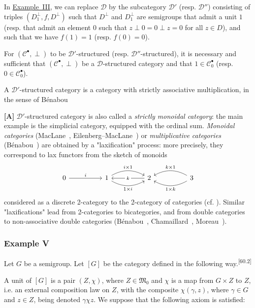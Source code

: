 \documentclass[a4paper,fleqn]{article}
\makeatletter
\theoremstyle{plain}
\theoremstyle{definition}
\def\blfootnote{\xdef\@thefnmark{}\@footnotetext}
\newcommand{\comm}[2]{{\normalfont\textsuperscript{[#1]}}\blfootnote{\label{footnote:#1}\textbf{[#1]} #2}}
\newenvironment{longcomm}[1]
  {\noindent\textbf{[#1]}\rmfamily}
  {}
\newcommand{\oldpage}[1]{{\marginpar{\footnotesize$\bigg\vert$\,\,\,\,\textit{p.~#1}}}}
\newcommand{\CC}{\mathcal{C}}
\newcommand{\MM}{\mathfrak{M}}
\newcommand{\DD}{\mathcal{D}}
\makeatother
\begin{document}
\oldpage{388}
In \hyperref[section:ii-3-iii]{Example~III}, we can replace $\DD$ by the subcategory $\DD'$ (resp. $\DD''$) consisting of triples $(D_1^\perp,f,D^\perp)$ such that $D^\perp$ and $D_1^\perp$ are semigroups that admit a unit $1$ (resp. that admit an element $0$ such that $z\perp0=0\perp z=0$ for all $z\in D$), and such that we have $f(1)=1$ (resp. $f(0)=0$).

For $(\CC^\bullet,\perp)$ to be $\DD'$-structured (resp. $\DD''$-structured), it is necessary and sufficient that $(\CC^\bullet,\perp)$ be a $\DD$-structured category and that $1\in\CC_0^\bullet$ (resp. $0\in\CC_0^\bullet$).

A $\DD'$-structured category is a category with strictly associative multiplication, in the sense of Bénabou~\cite{comm1}

\begin{longcomm}{60.1}
  A $\DD'$-structured category is also called a \emph{strictly monoidal category}: the main example is the simplicial category, equipped with the ordinal sum.
  \emph{Monoidal categories} (MacLane~\cite{comm71}, Eilenberg–MacLane~\cite{comm32}) or \emph{multiplicative categories} (Bénabou~\cite{comm4}) are obtained by a "laxification" process: more precisely, they correspond to lax functors from the sketch of monoids
  \[
    \begin{tikzcd}[sep=huge]
      0
        \ar[r,"i"]
      & 1
        \ar[r,bend left=30,"i\times1"]
        \ar[r,bend right=30,swap,"1\times i"]
      & 2
        \ar[l,"k"description]
      & 3
        \ar[l,bend left=30,"1\times k"]
        \ar[l,bend right=30,swap,"k\times1"]
    \end{tikzcd}
  \]
  considered as a discrete 2-category to the 2-category of categories (cf. \cite{coll117}).
  Similar "laxifications" lead from 2-categories to bicategories, and from double categories to non-associative double categories (Bénabou~\cite{comm6}, Chamaillard~\cite{comm20}, Moreau~\cite{comm78}).
\end{longcomm}


\subsubsection*{Example V}
\label{section:ii-3-v}

Let $G$ be a semigroup.
Let $[G]$ be the category defined in the following way.\comm{60.2}{This $[G]$ is the \emph{category of $G$-spaces}.}

A unit of $[G]$ is a pair $(Z,\chi)$, where $Z\in\MM_0$ and $\chi$ is a map from $G\times Z$ to $Z$, i.e. an external composition law on $Z$, with the composite $\chi(\gamma,z)$, where $\gamma\in G$ and $z\in Z$, being denoted $\gamma\chi z$.
We suppose that the following axiom is satisfied:
\end{document}
